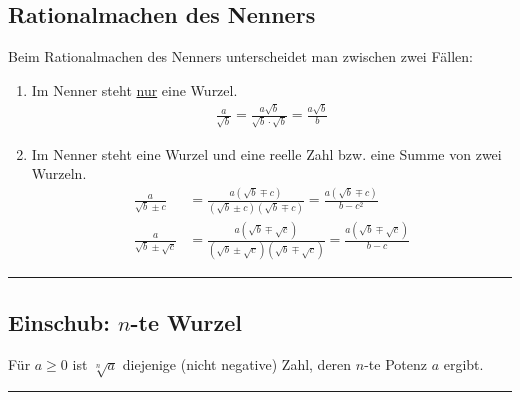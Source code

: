 \documentclass{report}
\newcommand{\x}{\cdot}
\newcommand{\trennl}{\noindent\rule[0.5ex]{\linewidth}{1.5pt}}
\theoremstyle{definition}
\theoremstyle{definition}
\theoremstyle{an}
\theoremstyle{lem}
\theoremstyle{def}
\theoremstyle{def}
\begin{document}
	\subsection{Rationalmachen des Nenners}
	\begin{defi}
		Beim Rationalmachen des Nenners unterscheidet man zwischen zwei Fällen:
		\begin{enumerate}
			\item Im Nenner steht \underline{nur} eine Wurzel. 
			\begin{align}
				\frac{a}{\sqrt{b}}=\frac{a\sqrt{b}}{\sqrt{b}\x \sqrt{b}}= \frac{a\sqrt{b}}{b} \label{eq:eq5}
			\end{align}
			\item Im Nenner steht eine Wurzel und eine reelle Zahl bzw. eine Summe von zwei Wurzeln.
			\begin{align}
				\frac{a}{\sqrt{b}\pm c}&=\frac{a\left(\sqrt{b}\mp c\right)}{\left(\sqrt{b}\pm c\right)\left(\sqrt{b}\mp c\right)}=\frac{a\left(\sqrt{b}\mp c\right)}{b-c^2} \\
				\frac{a}{\sqrt{b}\pm \sqrt{c}}&=\frac{a\left(\sqrt{b}\mp \sqrt{c}\right)}{\left(\sqrt{b}\pm \sqrt{c}\right)\left(\sqrt{b}\mp \sqrt{c}\right)}=\frac{a\left(\sqrt{b}\mp \sqrt{c}\right)}{b-c}
			\end{align}
		\end{enumerate}
	\end{defi}
	\trennl
	\subsection{Einschub: $n$-te Wurzel}
	\begin{defi}[$n$-te Wurzel]
		Für $a\geq 0$ ist $\sqrt[n]{a}$ diejenige (nicht negative) Zahl, deren $n$-te Potenz $a$ ergibt.
	\end{defi}
	\trennl
\end{document}
